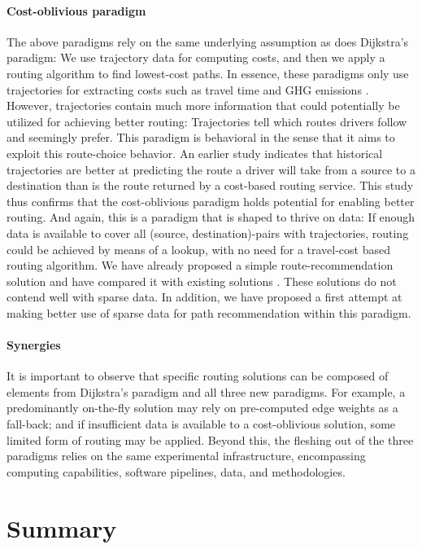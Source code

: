 \documentclass[11pt]{article}
\begin{document}
\paragraph{Cost-oblivious paradigm} The above paradigms rely on the same underlying assumption as does Dijkstra's paradigm: We use trajectory data for computing costs, and then we apply a routing algorithm to find lowest-cost paths. In essence, these paradigms only use trajectories for extracting costs such as travel time and GHG emissions \cite{12}. However, trajectories contain much more information that could potentially be utilized for achieving better routing: Trajectories tell which routes drivers follow and seemingly prefer. This paradigm is behavioral in the sense that it aims to exploit this route-choice behavior. An earlier study \cite{13} indicates that historical trajectories are better at predicting the route a driver will take from a source to a destination than is the route returned by a cost-based routing service. This study thus confirms that the cost-oblivious paradigm holds potential for enabling better routing. And again, this is a paradigm that is shaped to thrive on data: If enough data is available to cover all (source, destination)-pairs with trajectories, routing could be achieved by means of a lookup, with no need for a travel-cost based routing algorithm. We have already proposed a simple route-recommendation solution and have compared it with existing solutions \cite{14}. These solutions do not contend well with sparse data. In addition, we have proposed a first attempt at making better use of sparse data \cite{15} for path recommendation within this paradigm.

\paragraph{Synergies} It is important to observe that specific routing solutions can be composed of elements from Dijkstra's paradigm and all three new paradigms. For example, a predominantly on-the-fly solution may rely on pre-computed edge weights as a fall-back; and if insufficient data is available to a cost-oblivious solution, some limited form of routing may be applied. Beyond this, the fleshing out of the three paradigms relies on the same experimental infrastructure, encompassing computing capabilities, software pipelines, data, and methodologies. 

\section{Summary}
\end{document}
